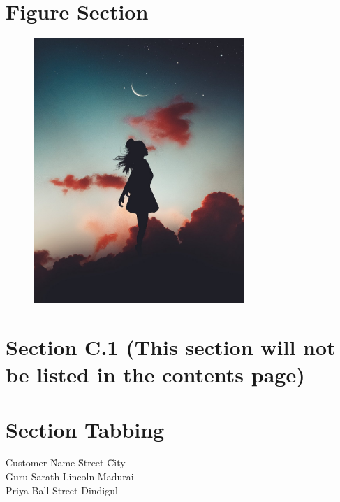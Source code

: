 \documentclass[a4paper,12pt]{book}
\begin{document}
\section{Figure Section}
\blindtext
%
%
\begin{figure}[ht] %
	\centering
	\includegraphics[width=8cm]{pic.jpg}
	\end{figure}
\blindtext

\section*{Section C.1 (This section will not be listed in the contents page)} %
\blindtext
\pagebreak

\section{Section Tabbing}
%
%
\begin{tabbing}
	Customer \= Name \hspace*{1.5cm} \= Street \hspace*{1.5cm} \= City \\ %
	\> Guru Sarath \> Lincoln \> Madurai \\ %
	\> Priya \> Ball Street \> Dindigul \\
\end{tabbing}
\end{document}
